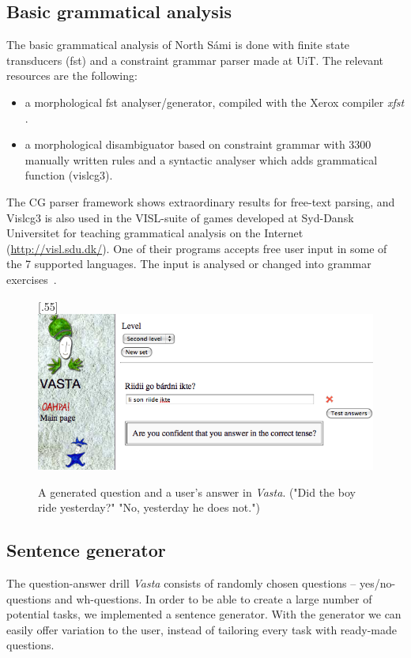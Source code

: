 \documentclass[11pt]{article}
\begin{document}
\subsection{Basic grammatical analysis}
The basic grammatical analysis of North Sámi is done with finite state transducers (fst) and a constraint grammar parser made at UiT. The relevant resources are the following:
\begin{itemize}
\item a morphological fst analyser/generator, compiled with the Xerox compiler \textit{xfst} \cite{BeesleyKarttunen:03}.  
\item a morphological disambiguator based on constraint grammar with 3300 manually written rules and a syntactic analyser which adds grammatical function (vislcg3). 
\end{itemize} 

The CG parser framework shows extraordinary results for free-text parsing, and Vislcg3 is also used in the VISL-suite of games developed at Syd-Dansk Universitet for teaching grammatical analysis on the Internet (\url{http://visl.sdu.dk/}). One of their  programs accepts free user input in some of the 7 supported languages. The input is analysed or changed into grammar exercises~\cite{Bick:05}.


\begin{figure}[htbp]
\begin{center}
\scalebox{.55}[.55]{\includegraphics{presentation/img/newvasta.png}}\\
\caption{A generated question and a user's answer in \textit{Vasta}. ("Did the boy ride yesterday?" "No, yesterday he does not.")}
\label{vastasent}
\end{center}
\end{figure}


\subsection{Sentence generator}
The question-answer drill \textit{Vasta} consists of randomly chosen questions -- yes/no-questions and wh-questions. In order to be able to create a large number of potential tasks, we implemented a sentence generator. With the generator we can easily offer variation to the user, instead of tailoring every task with ready-made questions.
\end{document}
